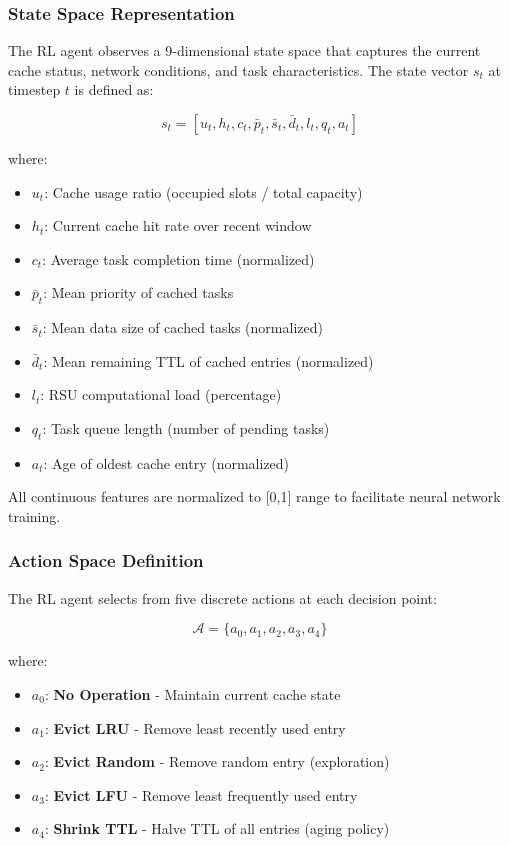 \subsubsection{State Space Representation}

The RL agent observes a 9-dimensional state space that captures the current cache status, network conditions, and task characteristics. The state vector $s_t$ at timestep $t$ is defined as:

\begin{equation}
s_t = [u_t, h_t, c_t, \bar{p}_t, \bar{s}_t, \bar{d}_t, l_t, q_t, a_t]
\end{equation}

where:
\begin{itemize}
    \item $u_t$: Cache usage ratio (occupied slots / total capacity)
    \item $h_t$: Current cache hit rate over recent window
    \item $c_t$: Average task completion time (normalized)
    \item $\bar{p}_t$: Mean priority of cached tasks
    \item $\bar{s}_t$: Mean data size of cached tasks (normalized)
    \item $\bar{d}_t$: Mean remaining TTL of cached entries (normalized)
    \item $l_t$: RSU computational load (percentage)
    \item $q_t$: Task queue length (number of pending tasks)
    \item $a_t$: Age of oldest cache entry (normalized)
\end{itemize}

All continuous features are normalized to [0,1] range to facilitate neural network training.

\subsubsection{Action Space Definition}

The RL agent selects from five discrete actions at each decision point:

\begin{equation}
\mathcal{A} = \{a_0, a_1, a_2, a_3, a_4\}
\end{equation}

where:
\begin{itemize}
    \item $a_0$: \textbf{No Operation} - Maintain current cache state
    \item $a_1$: \textbf{Evict LRU} - Remove least recently used entry
    \item $a_2$: \textbf{Evict Random} - Remove random entry (exploration)
    \item $a_3$: \textbf{Evict LFU} - Remove least frequently used entry
    \item $a_4$: \textbf{Shrink TTL} - Halve TTL of all entries (aging policy)
\end{itemize}

